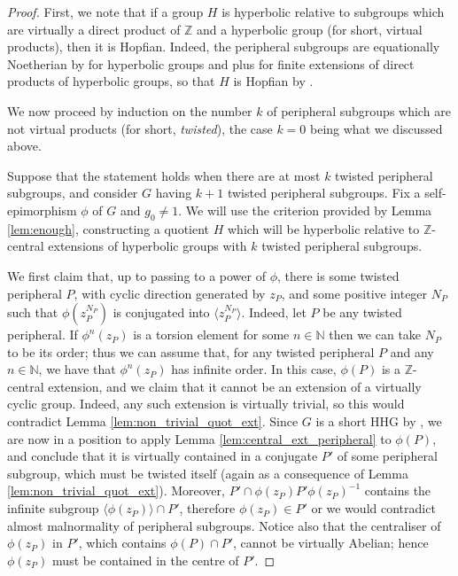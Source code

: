 \documentclass[svgnames]{amsart}
\theoremstyle{plain}
\theoremstyle{definition}
\newcommand{\Z}{\mathbb{Z}}
\begin{document}
\begin{proof}
First, we note that if a group $H$ is hyperbolic relative to subgroups which are virtually a direct product of $\mathbb Z$ and a hyperbolic group (for short, virtual products), then it is Hopfian. Indeed, the peripheral subgroups are equationally Noetherian by \cite[Corollary 6.13]{ReinfeldWeidmann} for hyperbolic groups and \cite[Theorem E]{Val18} plus \cite[Theorem 1]{BMR97} for finite extensions of direct products of hyperbolic groups, so that $H$ is Hopfian by \cite[Corollary 3.14 and Theorem D]{Groves_Hull:eq_noetherian}.

We now proceed by induction on the number $k$ of peripheral subgroups which are not virtual products (for short, \emph{twisted}), the case $k=0$ being what we discussed above.

Suppose that the statement holds when there are at most $k$ twisted peripheral subgroups, and consider $G$ having $k+1$ twisted peripheral subgroups. Fix a self-epimorphism $\phi$ of $G$ and $g_0\neq 1$. We will use the criterion provided by Lemma \ref{lem:enough}, constructing a quotient $H$ which will be hyperbolic relative to $\Z$-central extensions of hyperbolic groups with $k$ twisted peripheral subgroups.
\par\medskip

We first claim that, up to passing to a power of $\phi$, there is some twisted peripheral $P$, with cyclic direction generated by $z_P$, and some positive integer $N_P$ such that $\phi(z_P^{N_P})$ is conjugated into $\langle z_P^{N_P}\rangle$. Indeed, let $P$ be any twisted peripheral. If $\phi^n(z_P)$ is a torsion element for some $n\in \mathbb{N}$ then we can take $N_P$ to be its order; thus we can assume that, for any twisted peripheral $P$ and any $n\in \mathbb{N}$, we have that $\phi^n(z_P)$ has infinite order. In this case, $\phi(P)$ is a $\mathbb Z$-central extension, and we claim that it cannot be an extension of a virtually cyclic group. Indeed, any such extension is virtually trivial, so this would contradict Lemma \ref{lem:non_trivial_quot_ext}. Since $G$ is a short HHG by \cite[Proposition 6.3]{Short_HHG:I}, we are now in a position to apply Lemma \ref{lem:central_ext_peripheral} to $\phi(P)$, and conclude that it is virtually contained in a conjugate $P'$ of some peripheral subgroup, which must be twisted itself (again as a consequence of Lemma \ref{lem:non_trivial_quot_ext}). Moreover, $P'\cap \phi(z_P) P' \phi(z_P)^{-1}$ contains the infinite subgroup $\langle\phi(z_P)\rangle \cap P'$, therefore $\phi(z_P)\in P'$ or we would contradict almost malnormality of peripheral subgroups. Notice also that the centraliser of $\phi(z_P)$ in $P'$, which contains $\phi(P)\cap P'$, cannot be virtually Abelian; hence $\phi(z_P)$ must be contained in the centre of $P'$. 


\end{proof}
\end{document}
